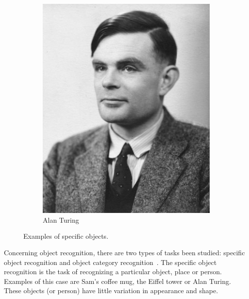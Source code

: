 \documentclass[12pt,final,twoside]{report}
\theoremstyle{plain}
\theoremstyle{definition}
\theoremstyle{remark}
\begin{document}
\begin{figure}[tbhp]
\begin{subfigure}[b]{.3\textwidth}
    \includegraphics[width=\textwidth]{turing}
    \caption{Alan Turing}
  \end{subfigure}
  \caption{Examples of specific objects.}
  \label{fig:specific}
\end{figure}

Concerning object recognition, there are two types of tasks been studied: specific object recognition and object category recognition~\cite{grauman_visual_2011}. The specific object recognition is the task of recognizing a particular object, place or person. Examples of this case are Sam's coffee mug, the Eiffel tower or Alan Turing. These objects (or person) have little variation in appearance and shape. 
\end{document}
